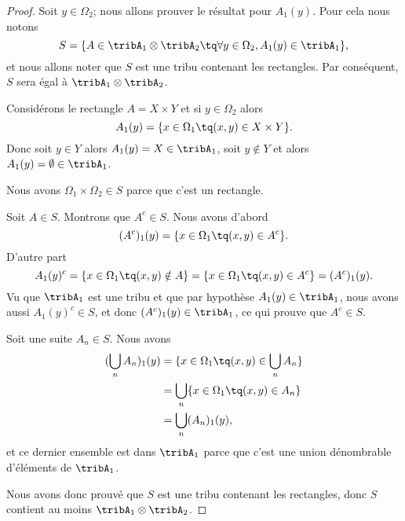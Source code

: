 					 \begin{proof}
					 Soit \( y\in\Omega_2\); nous allons prouver le résultat pour \( A_1(y)\). Pour cela nous notons
					 \begin{equation}
					 S=\{ A\in \tribA_1\otimes\tribA_2\tq \forall y\in\Omega_2, A_1(y)\in\tribA_1 \},
					 \end{equation}
					 et nous allons noter que \( S\) est une tribu contenant les rectangles. Par conséquent, \( S\) sera égal à \( \tribA_1\otimes \tribA_2\).

					 \begin{subproof}

					 Considérons le rectangle \( A=X\times Y\) et si \( y\in \Omega_2\) alors
					 \begin{equation}
					 A_1(y)=\{ x\in \Omega_1\tq (x,y)\in X\times Y \}.
					 \end{equation}
					 Donc soit \( y\in Y\) alors \( A_1(y)=X\in\tribA_1\), soit \( y\notin Y\) et alors \( A_1(y)=\emptyset\in\tribA_1\).


					 Nous avons \( \Omega_1\times \Omega_2\in S\) parce que c'est un rectangle.

					  Soit \( A\in S\). Montrons que \( A^c\in S\). Nous avons d'abord
					 \begin{equation}
					 (A^c)_1(y)=\{ x\in \Omega_1\tq (x,y)\in A^c \}.
					 \end{equation}
					 D'autre part
					 \begin{equation}
					 A_1(y)^c=\{ x\in\Omega_1\tq (x,y)\notin A \}=\{ x\in \Omega_1\tq (x,y)\in A^c \}=(A^c)_1(y).
					 \end{equation}
					 Vu que \( \tribA_1\) est une tribu et que par hypothèse \( A_1(y)\in\tribA_1\), nous avons aussi \( A_1(y)^c\in S\), et donc \( (A^c)_1(y)\in \tribA_1\), ce qui prouve que \( A^c\in S\).

					  Soit une suite \( A_n\in S\). Nous avons
					 \begin{subequations}
					 \begin{align}
					 (\bigcup_nA_n)_1(y) & =\{ x\in\Omega_1\tq (x,y)\in \bigcup_nA_n \} \\
																	& =\bigcup_n\{ x\in\Omega_1\tq (x,y)\in A_n \} \\
																	& =\bigcup_n(A_n)_1(y),
					 \end{align}
					 \end{subequations}
					 et ce dernier ensemble est dans \( \tribA_1\) parce que c'est une union dénombrable d'éléments de \( \tribA_1\).

					 \end{subproof}
					 Nous avons donc prouvé que \( S\) est une tribu contenant les rectangles, donc \( S\) contient au moins \( \tribA_1\otimes \tribA_2\).
					 \end{proof}

